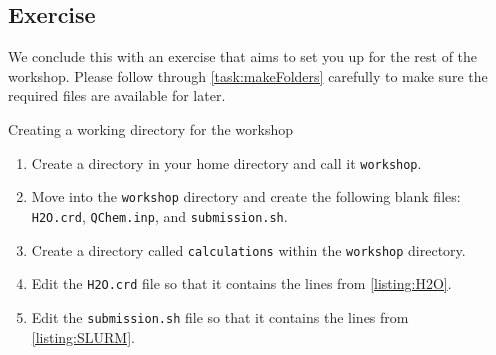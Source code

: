     \subsection{Exercise}

      We conclude this  with an exercise that aims to set you up for the rest of the workshop.
      Please follow through \cref{task:makeFolders} carefully to make sure the required files are available for later.

      \begin{task}[label=task:makeFolders]{Creating a working directory for the workshop}
        \small
        \begin{enumerate}[label=(\alph*)]
          \item Create a directory in your home directory and call it \texttt{workshop}.
          \item Move into the \texttt{workshop} directory and create the following blank files: \texttt{H2O.crd}, \texttt{QChem.inp}, and \texttt{submission.sh}.
          \item Create a directory called \texttt{calculations} within the \texttt{workshop} directory.
          \item Edit the \texttt{H2O.crd} file so that it contains the lines from \cref{listing:H2O}.
          \item Edit the \texttt{submission.sh} file so that it contains the lines from \cref{listing:SLURM}.
        \end{enumerate}
      \end{task}


